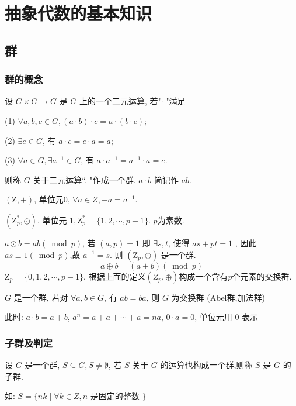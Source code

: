 \chapter{抽象代数的基本知识}
\section{群}
\subsection{群的概念}

\begin{definition}
    设 $ G \times G \rightarrow G $ 是 $ G $ 上的一个二元运算, 若"$\cdot$ "满足
    
(1) $ \forall a, b, c \in G,(a \cdot b) \cdot c=a \cdot(b \cdot c) $;

(2) $ \exists e \in G $, 有 $ a \cdot e=e \cdot a=a $;

(3) $ \forall a \in G, \exists a^{-1} \in G $, 有 $ a \cdot a^{-1}=a^{-1} \cdot a=e $.

则称 $ G $ 关于二元运算“. "作成一个群. $ a \cdot b $ 简记作 $ a b $.
\end{definition}
\begin{example}
    $ (\mathrm{Z},+) $, 单位元0, $ \forall a \in Z,-a=a^{-1} $.
\end{example}

\begin{example}
 $ \left(\mathrm{Z}_{p}^{*}, \odot\right) $, 单位元 $ 1, \mathrm{Z}_{p}^{*}=\{1,2, \cdots, p-1\} $. $p$为素数.
 
 $ a \odot b=a b(\bmod p) $, 若 $ (a, p)=1 $ 即 $ \exists s, t $, 使得 $ a s+p t=1 $ , 因此$ as\equiv 1(\bmod p) $,故 $ a^{-1}=s $. 则 $ \left(\mathrm{Z}_{p}, \odot\right) $ 是一个群.
$$
a \oplus b=(a+b)(\bmod p)
$$
$\mathrm{Z}_{p}=\{0,1,2, \cdots, p-1\}$, 根据上面的定义$(Z_p,\oplus)$构成一个含有$p$个元素的交换群.

\begin{remark}
    $ G $ 是一个群, 若对 $ \forall a, b \in G $, 有 $ a b=b a $, 则 $ G $ 为交换群 (Abel群,加法群)
    
此时: $ a \cdot b=a+b $, $a^{n}=a+a+\cdots+a=n a$, $ 0 \cdot a=0 $, 单位元用 0 表示
\end{remark}
\end{example}

\subsection{子群及判定}
\begin{definition}
    设 $ G $ 是一个群, $ S \subseteq G, S \neq \emptyset $, 若 $ S $ 关于 $ G $ 的运算也构成一个群,则称 $ S $ 是 $ G $ 的子群.
\end{definition}
如: $ S=\{n k \mid \forall k \in Z, n $ 是固定的整数 $ \} $

